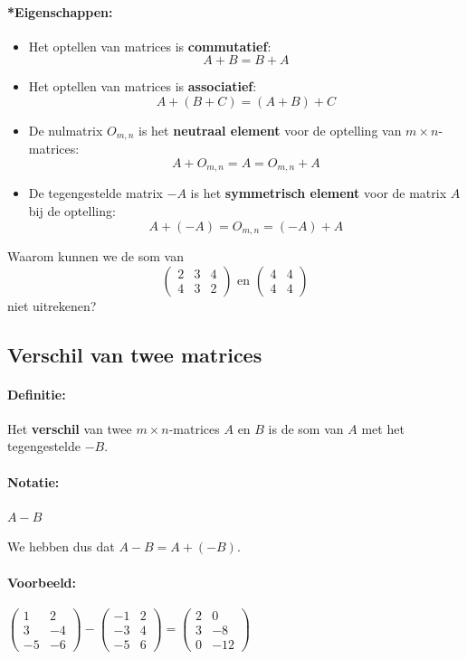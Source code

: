 \documentclass[12pt,twoside]{article}
\begin{document}
\paragraph*{*Eigenschappen:}\mbox{}

\begin{itemize}
\item Het optellen van matrices is {\bf commutatief}:
  $$A+B = B+A$$
\item Het optellen van matrices is {\bf associatief}:
  $$A + (B + C) = (A + B) + C$$
\item De nulmatrix $O_{m,n}$ is het {\bf neutraal element} voor de optelling van $m \times n$-matrices:
  $$A + O_{m,n} = A = O_{m,n} + A$$
\item De tegengestelde matrix $-A$ is het {\bf symmetrisch element} voor de matrix $A$ bij de optelling:
  $$A + (-A) = O_{m,n} = (-A) + A$$
\end{itemize}

\begin{oefening}
  Waarom kunnen we de som van
  $$
  \begin{pmatrix}
    2 & 3 & 4\\
    4 & 3 & 2
  \end{pmatrix}
  \mbox{ en }
  \begin{pmatrix}
    4 & 4\\
    4 & 4
  \end{pmatrix}
  $$
  niet uitrekenen?
\end{oefening}

\subsection{Verschil van twee matrices}

\paragraph*{Definitie:} Het {\bf verschil} van twee $m \times n$-matrices $A$ en $B$ is de som van $A$ met het tegengestelde $-B$.

\paragraph*{Notatie:} $A - B$

We hebben dus dat $A - B = A + (-B)$.

\paragraph*{Voorbeeld:}
$
\begin{pmatrix}
  1 & 2\\
  3 & -4\\
  -5 & -6
\end{pmatrix}
-
\begin{pmatrix}
  -1 & 2\\
  -3 & 4\\
  -5 & 6
\end{pmatrix}
=
\begin{pmatrix}
  2 & 0\\
  3 & -8\\
  0 & -12
\end{pmatrix}
$
\end{document}
